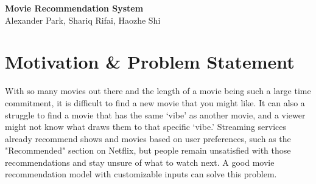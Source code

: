 \documentclass[11pt, letterpaper]{article}
\begin{document}
\begin{center}
  {\Large\bfseries\color{headcolor} Movie Recommendation System}\\[4pt]
  {\normalsize Alexander Park, Shariq Rifai, Haozhe Shi}\\[2pt]
\end{center}

\vspace{4pt}

\section{Motivation \& Problem Statement}
\begin{tcolorbox}[sectionbox, height=4.6cm, valign=top]
    With so many movies out there and the length of a movie being such a large time commitment, it is difficult to find a new movie that you might like. It can also a struggle to find a movie that has the same ‘vibe’ as another movie, and a viewer might not know what draws them to that specific ‘vibe.’ Streaming services already recommend shows and movies based on user preferences, such as the "Recommended" section on Netflix, but people remain unsatisfied with those recommendations and stay unsure of what to watch next. A good movie recommendation model with customizable inputs can solve this problem.
\end{tcolorbox}

\end{document}
